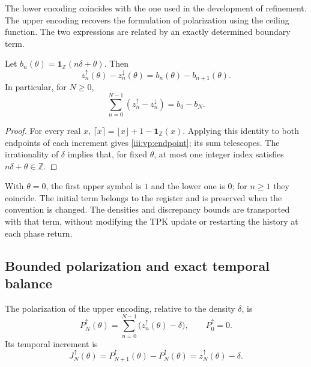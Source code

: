 The lower encoding coincides with the one used in the development
of refinement. The upper encoding recovers the formulation of
polarization using the ceiling function. The two expressions are related
by an exactly determined boundary term.

\begin{proposition}
Let $b_n(\theta)=\mathbf1_{\mathbb Z}(n\delta+\theta)$. Then
\begin{equation}
 z_n^{\uparrow}(\theta)-z_n^{\downarrow}(\theta)
 =b_n(\theta)-b_{n+1}(\theta).
 \label{iii:vp:endpoint}
\end{equation}
In particular, for $N\geq0$,
\[
 \sum_{n=0}^{N-1}(z_n^{\uparrow}-z_n^{\downarrow})
 =b_0-b_N.
\]
\end{proposition}
\begin{proof}
For every real $x$, $\lceil x\rceil=\lfloor x\rfloor+1-
\mathbf1_{\mathbb Z}(x)$. Applying this identity to both endpoints
of each increment gives \eqref{iii:vp:endpoint}; its sum telescopes.
The irrationality of $\delta$ implies that, for fixed $\theta$, at most
one integer index satisfies $n\delta+\theta\in\mathbb Z$.
\end{proof}

With $\theta=0$, the first upper symbol is $1$ and the lower one is $0$;
for $n\geq1$ they coincide. The initial term belongs to the register and is
preserved when the convention is changed. The densities and discrepancy
bounds are transported with that term, without modifying the TPK update
or restarting the history at each phase return.

\subsection{Bounded polarization and exact temporal balance}

\begin{definition}
The polarization of the upper encoding, relative to the density
$\delta$, is
\begin{equation}
 P_N^{\uparrow}(\theta)
 =\sum_{n=0}^{N-1}\bigl(z_n^{\uparrow}(\theta)-\delta\bigr),
 \qquad P_0^{\uparrow}=0.
 \label{iii:vp:polarization}
\end{equation}
Its temporal increment is
\begin{equation}
 J_N^{\uparrow}(\theta)
 =P_{N+1}^{\uparrow}(\theta)-P_N^{\uparrow}(\theta)
 =z_N^{\uparrow}(\theta)-\delta.
 \label{iii:vp:current}
\end{equation}
\end{definition}

